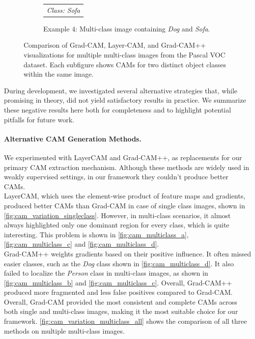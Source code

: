 \begin{figure}[!t]
{\begin{minipage}{0.9\textwidth}
\begin{subfigure}[t]{0.48\textwidth}
\begin{tabular}{c c c}
          \multicolumn{3}{c}{{\scriptsize \textit{Class: Sofa}}} \\
        \end{tabular}
        \caption{Example 4: Multi-class image containing \textit{Dog} and \textit{Sofa}.}
        \label{fig:cam_multiclass_d}
      \end{subfigure}
      
      \caption{Comparison of Grad-CAM, Layer-CAM, and Grad-CAM++ visualizations for multiple multi-class images from the Pascal VOC dataset. Each subfigure shows CAMs for two distinct object classes within the same image.}
      \label{fig:cam_variation_multiclass_all}
    \end{minipage}
    }
  \end{figure}
  
  
  During development, we investigated several alternative strategies that, while promising in theory, did not yield satisfactory results in practice. We summarize these negative results here both for completeness and to highlight potential pitfalls for future work.  
  
  \paragraph{Alternative CAM Generation Methods.} 
  We experimented with LayerCAM and Grad-CAM++, as replacements for our primary CAM extraction mechanism. Although these methods are widely used in weakly supervised settings, in our framework they couldn't produce better CAMs. \\
  LayerCAM, which uses the element-wise product of feature maps and gradients, produced better CAMs than Grad-CAM in case of single class images, shown in \autoref{fig:cam_variation_singleclass}. However, in multi-class scenarios, it almost always highlighted only one dominant region for every class, which is quite interesting. This problem is shown in \autoref{fig:cam_multiclass_a}, \autoref{fig:cam_multiclass_c} and \autoref{fig:cam_multiclass_d}. \\
  Grad-CAM++ weights gradients based on their positive influence. It often missed easier classes, such as the \textit{Dog} class shown in \autoref{fig:cam_multiclass_d}. It also failed to localize the \textit{Person} class in multi-class images, as shown in \autoref{fig:cam_multiclass_b} and \autoref{fig:cam_multiclass_c}. Overall, Grad-CAM++ produced more fragmented and less false positives compared to Grad-CAM.\\
  Overall, Grad-CAM provided the most consistent and complete CAMs across both single and multi-class images, making it the most suitable choice for our framework. \autoref{fig:cam_variation_multiclass_all} shows the comparison of all three methods on multiple multi-class images.
  
